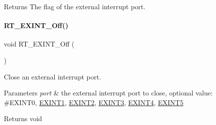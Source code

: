 \begin{DoxyReturn}{Returns}
The flag of the external interrupt port. 
\end{DoxyReturn}
\mbox{\label{a00011_a9889abece7fc3ef133b0a93d7b5e54f2}} 
\paragraph{\texorpdfstring{R\+T\+\_\+\+E\+X\+I\+N\+T\+\_\+\+Off()}{RT\_EXINT\_Off()}}
{\footnotesize\ttfamily void R\+T\+\_\+\+E\+X\+I\+N\+T\+\_\+\+Off (\begin{DoxyParamCaption}\item[{port}]{ }\end{DoxyParamCaption})\hspace{0.3cm}{\ttfamily [inline]}}



Close an external interrupt port. 


\begin{DoxyParams}{Parameters}
{\em port} & the external interrupt port to close, optional value\+: \#\+E\+X\+I\+N\+T0, \mbox{\hyperlink{a00011_af11f5754cc92430795a63bb53d964cd4a6c87103fd7c63fc99ee4b631c0a4dac4}{E\+X\+I\+N\+T1}}, \mbox{\hyperlink{a00011_af11f5754cc92430795a63bb53d964cd4a92c5398067978d1aefd4ba3c276dec32}{E\+X\+I\+N\+T2}}, \mbox{\hyperlink{a00011_af11f5754cc92430795a63bb53d964cd4a3c37ddaa34bf4297b421d8577be06895}{E\+X\+I\+N\+T3}}, \mbox{\hyperlink{a00011_af11f5754cc92430795a63bb53d964cd4a766aca243fc0f7aa292c791202bef6e7}{E\+X\+I\+N\+T4}}, \mbox{\hyperlink{a00011_af11f5754cc92430795a63bb53d964cd4af59c814bf9818345f24bb79e7533945c}{E\+X\+I\+N\+T5}} \\
\hline
\end{DoxyParams}
\begin{DoxyReturn}{Returns}
void 
\end{DoxyReturn}
\mbox{\label{a00011_ac2664665be12652ffe3d884f1423f672}} 
